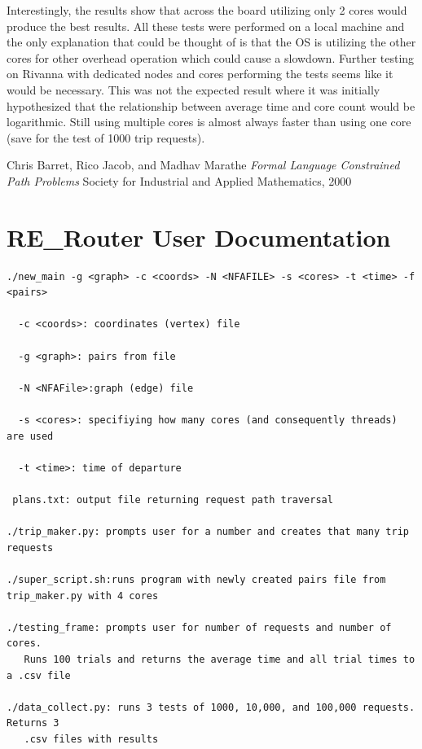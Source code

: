 \documentclass[English]{article}
\theoremstyle{remark}
\numberwithin{equation}{section}
\begin{document}
Interestingly, the results show that across the board utilizing only 2 cores would produce the best results. All these tests were performed on a local machine and the only explanation that could be thought of is that the OS is utilizing the other cores for other overhead operation which could cause a slowdown. Further testing on Rivanna with dedicated nodes and cores performing the tests seems like it would be necessary. This was not the expected result where it was initially hypothesized that the relationship between average time and core count would be logarithmic. Still using multiple cores is almost always faster than using one core (save for the test of 1000 trip requests). 



\begin{thebibliography}{9}
Chris Barret, Rico Jacob, and Madhav Marathe
\textit{Formal Language Constrained Path Problems}
Society for Industrial and Applied Mathematics, 2000
\end{thebibliography}

\cleardoublepage
\appendix

\section{RE\_Router User Documentation}
\label{sec:documentation}


\begin{verbatim}
./new_main -g <graph> -c <coords> -N <NFAFILE> -s <cores> -t <time> -f <pairs>

  -c <coords>: coordinates (vertex) file
  
  -g <graph>: pairs from file

  -N <NFAFile>:graph (edge) file

  -s <cores>: specifiying how many cores (and consequently threads) are used
  
  -t <time>: time of departure
  
 plans.txt: output file returning request path traversal
 
./trip_maker.py: prompts user for a number and creates that many trip requests

./super_script.sh:runs program with newly created pairs file from trip_maker.py with 4 cores

./testing_frame: prompts user for number of requests and number of cores. 
   Runs 100 trials and returns the average time and all trial times to a .csv file

./data_collect.py: runs 3 tests of 1000, 10,000, and 100,000 requests. Returns 3
   .csv files with results

  
\end{verbatim}
\end{document}
